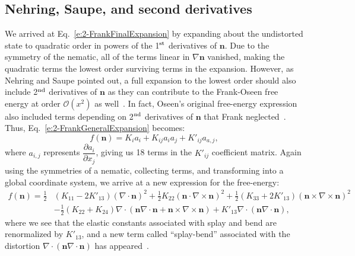 \subsection{Nehring, Saupe, and second derivatives}
We arrived at Eq.~\ref{e:2-FrankFinalExpansion} by expanding about the undistorted state to quadratic order in powers of the 1$^\textup{st}$ derivatives of $\mathbf{n}$.
Due to the symmetry of the nematic, all of the terms linear in $\nabla \mathbf{n}$ vanished, making the quadratic terms the lowest order surviving terms in the expansion.
However, as Nehring and Saupe pointed out, a full expansion to the lowest order should also include 2$^\textup{nd}$ derivatives of $\mathbf{n}$ as they can contribute to the Frank-Oseen free energy at order $\mathcal{O}(x^2)$ as well~\cite{RN60}.
In fact, Oseen's original free-energy expression also included terms depending on 2$^\textup{nd}$ derivatives of $\mathbf{n}$ that Frank neglected~\cite{RN205}.
Thus, Eq.~\ref{e:2-FrankGeneralExpansion} becomes:
\begin{equation}
  f(\mathbf{n}) = K_i a_i + K_{ij} a_i a_j + K'_{ij} a_{a,j},\label{e:2-NSGeneralExpansion}
\end{equation}
where $a_{i,j}$ represents $\dfrac{\partial a_i}{\partial x_j}$, giving us 18 terms in the $K'_{ij}$ coefficient matrix.
Again using the symmetries of a nematic, collecting terms, and transforming into a global coordinate system, we arrive at a new expression for the free-energy:
\begin{align}
  f(\mathbf{n}) = \frac{1}{2}&(K_{11} - 2K'_{13}) (\nabla \cdot \mathbf{n})^2 + \frac{1}{2}K_{22} (\mathbf{n} \cdot \nabla \times \mathbf{n})^2 + \frac{1}{2}(K_{33} + 2K'_{13}) (\mathbf{n} \times \nabla \times \mathbf{n})^2 \nonumber \\
    & - \frac{1}{2}(K_{22} + K_{24}) \nabla \cdot (\mathbf{n}\nabla \cdot \mathbf{n} + \mathbf{n} \times \nabla \times \mathbf{n})
      + K'_{13} \nabla \cdot (\mathbf{n} \nabla \cdot \mathbf{n}),\label{e:2-NSFinalExpansion}
\end{align}
where we see that the elastic constants associated with splay and bend are renormalized by $K'_{13}$, and a new term called ``splay-bend'' associated with the distortion $\nabla \cdot (\mathbf{n} \nabla \cdot \mathbf{n})$ has appeared~\cite{RN60}. \\

